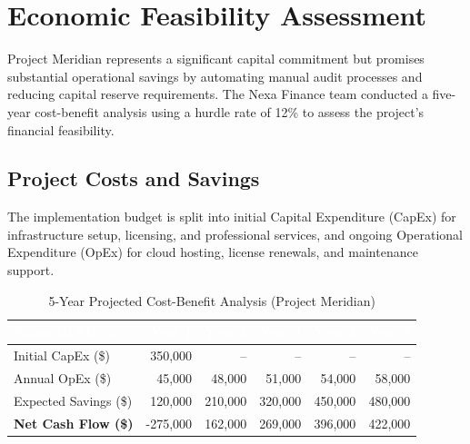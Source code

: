 \section{Economic Feasibility Assessment}
\label{sec:economic}

Project Meridian represents a significant capital commitment but promises substantial operational savings by automating manual audit processes and reducing capital reserve requirements. The Nexa Finance team conducted a five-year cost-benefit analysis using a hurdle rate of 12\% to assess the project's financial feasibility.

\vspace{1.2em}
\subsection{Project Costs and Savings}
The implementation budget is split into initial Capital Expenditure (CapEx) for infrastructure setup, licensing, and professional services, and ongoing Operational Expenditure (OpEx) for cloud hosting, license renewals, and maintenance support.

\vspace{0.8em}
\begin{table}[H]
\centering
\small
\begin{tabularx}{\textwidth}{@{} X r r r r r @{}}
\toprule
\rowcolor{primary}
\textcolor{white}{\textbf{Financial Metric}} & \textcolor{white}{\textbf{Year 1}} & \textcolor{white}{\textbf{Year 2}} & \textcolor{white}{\textbf{Year 3}} & \textcolor{white}{\textbf{Year 4}} & \textcolor{white}{\textbf{Year 5}} \\
\midrule
Initial CapEx (\$) & 350,000 & -- & -- & -- & -- \\
Annual OpEx (\$) & 45,000 & 48,000 & 51,000 & 54,000 & 58,000 \\
Expected Savings (\$) & 120,000 & 210,000 & 320,000 & 450,000 & 480,000 \\
\midrule
\textbf{Net Cash Flow (\$)} & -275,000 & 162,000 & 269,000 & 396,000 & 422,000 \\
\bottomrule
\end{tabularx}
\caption{5-Year Projected Cost-Benefit Analysis (Project Meridian)}
\label{tab:cash-flow}
\end{table}
\vspace{0.8em}


